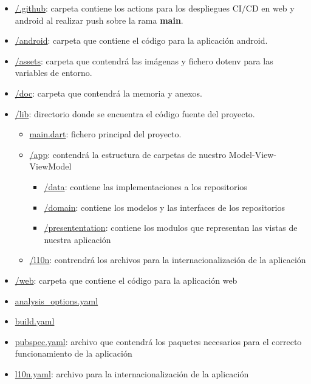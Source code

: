 \begin{itemize}
	\item \textcolor{darkblue}{\url{/.github}}: carpeta contiene los actions para los despliegues CI/CD en web y android al realizar push sobre la rama \textbf{main}.
	\item \textcolor{darkblue}{\url{/android}}: carpeta que contiene el código para la aplicación android.
	\item \textcolor{darkblue}{\url{/assets}}: carpeta que contendrá las imágenas y  fichero dotenv para las variables de entorno.
	\item \textcolor{darkblue}{\url{/doc}}: carpeta que contendrá la memoria y anexos.
	\item \textcolor{darkblue}{\url{/lib}}: directorio donde se encuentra el código fuente del proyecto.
		\begin{itemize}
			\item \textcolor{darkblue}{\url{main.dart}}: fichero principal del proyecto.
			\item \textcolor{darkblue}{\url{/app}}: contendrá la estructura de carpetas de nuestro Model-View-ViewModel
			\begin{itemize}
				\item \textcolor{darkblue}{\url{/data}}: contiene las implementaciones a los repositorios
				\item \textcolor{darkblue}{\url{/domain}}: contiene los modelos y las interfaces de los repositorios
				\item \textcolor{darkblue}{\url{/presententation}}: contiene los modulos que representan las vistas de nuestra aplicación
			\end{itemize}
			\item \textcolor{darkblue}{\url{/l10n}}: contrendrá los archivos para la internacionalización de la aplicación
		\end{itemize}
	\item \textcolor{darkblue}{\url{/web}}: carpeta que contiene el código para la aplicación web
	\item \textcolor{darkblue}{\url{analysis_options.yaml}}
	\item \textcolor{darkblue}{\url{build.yaml}}
	\item \textcolor{darkblue}{\url{pubspec.yaml}}: archivo que contendrá los paquetes necesarios para el correcto funcionamiento de la aplicación
	\item \textcolor{darkblue}{\url{l10n.yaml}}: archivo para la internacionalización de la aplicación
\end{itemize}


